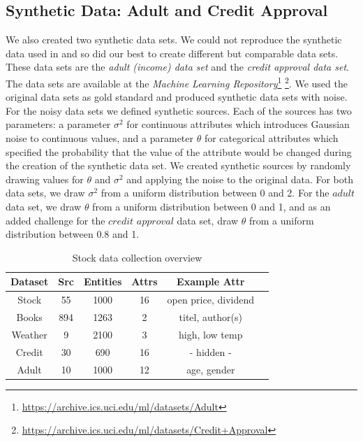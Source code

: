 \documentclass{acm_proc_article-sp}
\begin{document}
\subsection{Synthetic Data: Adult and Credit Approval} \label{sec:synth}

We also created two synthetic data sets. We could not reproduce the synthetic data used in \cite{li:resolving} and so did our best to create different but comparable data sets. These data sets are the \emph{adult (income) data set} and the \emph{credit approval data set}. The data sets are available at the \emph{Machine Learning Repository}\footnote{\url{https://archive.ics.uci.edu/ml/datasets/Adult}}
\footnote{\url{https://archive.ics.uci.edu/ml/datasets/Credit+Approval}}. We used the original data sets as gold standard and produced synthetic data sets with noise. For the noisy data sets we defined synthetic sources. Each of the sources has two parameters: a parameter $\sigma^2$ for continuous attributes which introduces Gaussian noise to continuous values, and a parameter $\theta$ for categorical attributes which specified the probability that the value of the attribute would be changed during the creation of the synthetic data set. We created synthetic sources by randomly drawing values for $\theta$ and $\sigma^2$ and applying the noise to the original data. For both data sets, we draw $\sigma^2$ from a uniform distribution between 0 and 2. For the $adult$ data set, we draw $\theta$ from a uniform distribution between 0 and 1, and as an added challenge for the $credit$ $approval$ data set, draw $\theta$ from a uniform distribution between $0.8$ and 1. 

\begin{table}[h] 
    \centering
{%
\begin{tabular}{  | c | c | c | c  | c | c |}		
\hline
\textbf{Dataset} & \textbf{Src} &  \textbf{Entities} & \textbf{Attrs}  & \textbf{Example Attr}  \\
\hline
 Stock & 55 &   1000 & 16 &  open price, dividend   \\
 Books & 894 &   1263 & 2 &  titel, author(s)   \\
 Weather & 9 &   2100 & 3 &  high, low temp   \\
 Credit & 30 &   690 & 16 &  - hidden -   \\
 Adult & 10 &   1000 & 12 &  age, gender   \\
\hline
\end{tabular}
}
 \caption{Stock data collection overview}%
    \label{fig:stock}%
\end{table}
\end{document}
